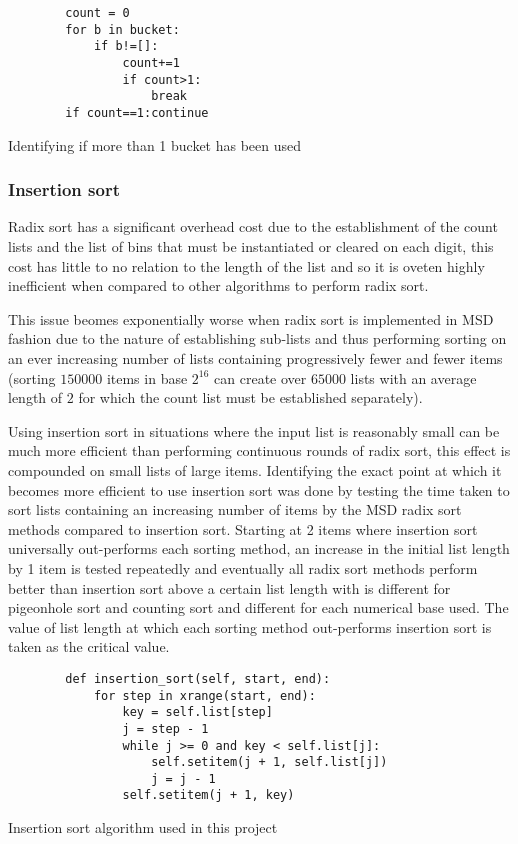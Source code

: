 \documentclass[12pt]{article}
\begin{document}
\begin{table}[H]
	\centering
	\begin{lstlisting}
		count = 0
		for b in bucket:
			if b!=[]:
				count+=1
				if count>1:
					break
		if count==1:continue
	\end{lstlisting}
	\caption*{Identifying if more than 1 bucket has been used}
\end{table}


\subsubsection{Insertion sort}
\label{sssec:insertionoptimization}
Radix sort has a significant overhead cost due to the establishment of the count lists and the list of bins that must be instantiated or cleared on each digit, this cost has little to no relation to the length of the list and so it is oveten highly inefficient when compared to other algorithms to perform radix sort.
\par
This issue beomes exponentially worse when radix sort is implemented in MSD fashion due to the nature of establishing sub-lists and thus performing sorting on an ever increasing number of lists containing progressively fewer and fewer items (sorting $150000$ items in base $2^{16}$ can create over $65000$ lists with an average length of $2$ for which the count list must be established separately).
\par
Using insertion sort in situations where the input list is reasonably small can be much more efficient than performing continuous rounds of radix sort, this effect is compounded on small lists of large items. Identifying the exact point at which it becomes more efficient to use insertion sort was done by testing the time taken to sort lists containing an increasing number of items by the MSD radix sort methods compared to insertion sort. Starting at 2 items where insertion sort universally out-performs each sorting method, an increase in the initial list length by 1 item is tested repeatedly and eventually all radix sort methods perform better than insertion sort above a certain list length with is different for pigeonhole sort and counting sort and different for each numerical base used. The value of list length at which each sorting method out-performs insertion sort is taken as the critical value. 
\begin{table}[H]
	\centering
	\begin{lstlisting}
        def insertion_sort(self, start, end):
            for step in xrange(start, end):
                key = self.list[step]
                j = step - 1
                while j >= 0 and key < self.list[j]:
                    self.setitem(j + 1, self.list[j])
                    j = j - 1
                self.setitem(j + 1, key)
	\end{lstlisting}
	\caption*{Insertion sort algorithm used in this project}
\end{table}
\end{document}
